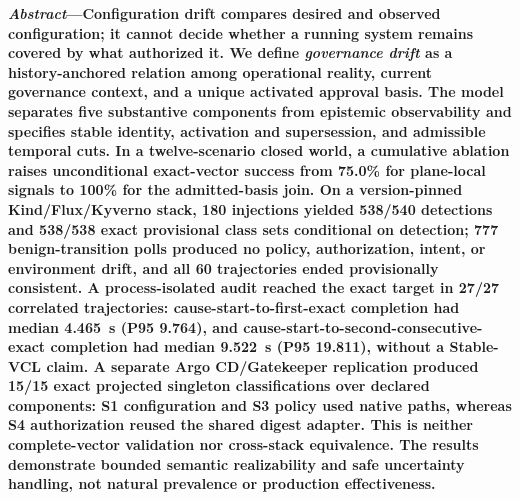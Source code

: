\documentclass[10pt,twocolumn]{article}
\theoremstyle{ieeedef}
\begin{document}

\noindent\textbf{\textit{Abstract}---Configuration drift compares desired and observed configuration; it cannot decide whether a running system remains covered by what authorized it. We define \emph{governance drift} as a history-anchored relation among operational reality, current governance context, and a unique activated approval basis. The model separates five substantive components from epistemic observability and specifies stable identity, activation and supersession, and admissible temporal cuts. In a twelve-scenario closed world, a cumulative ablation raises unconditional exact-vector success from 75.0\% for plane-local signals to 100\% for the admitted-basis join. On a version-pinned Kind/Flux/Kyverno stack, 180 injections yielded 538/540 detections and 538/538 exact provisional class sets conditional on detection; 777 benign-transition polls produced no policy, authorization, intent, or environment drift, and all 60 trajectories ended provisionally consistent. A process-isolated audit reached the exact target in 27/27 correlated trajectories: cause-start-to-first-exact completion had median 4.465~s (P95 9.764), and cause-start-to-second-consecutive-exact completion had median 9.522~s (P95 19.811), without a Stable-VCL claim. A separate Argo CD/Gatekeeper replication produced 15/15 exact projected singleton classifications over declared components: S1 configuration and S3 policy used native paths, whereas S4 authorization reused the shared digest adapter. This is neither complete-vector validation nor cross-stack equivalence. The results demonstrate bounded semantic realizability and safe uncertainty handling, not natural prevalence or production effectiveness.}
\end{document}
